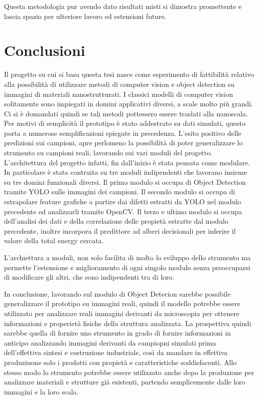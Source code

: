 \documentclass[12pt,a4paper,openright,twoside]{report}
\begin{document}
Questa metodologia pur avendo dato risultati misti si dimostra promettente e lascia spazio per ulteriore lavoro ed estensioni future. 


\begingroup
\let\clearpage\relax
\chapter*{Conclusioni}

Il progetto su cui si basa questa tesi nasce come esperimento di fattibilità relativo alla possibilità di utilizzare metodi di computer vision e object detection su immagini di materiali nanostrutturati. 
I classici modelli di computer vision solitamente sono impiegati in domini applicativi diversi, a scale molto più grandi. Ci si è domandati quindi se tali metodi pottessero essere traslati alla nanoscala. 
Per motivi di semplicità il prototipo è stato addestrato su dati simulati, questo porta a numerose semplificazioni spiegate in precedenza. 
L'esito positivo delle predizioni sui campioni, apre perlomeno la possibilità di poter generalizzare lo strumento su campioni reali, lavorando sui vari moduli del progetto.
L'architettura del progetto infatti, fin dall'inizio è stata pensata come modulare. In particolare è stata contruita su tre moduli indipendenti che lavorano insieme su tre domini funzionali diversi. Il primo modulo si occupa di Object Detection tramite YOLO sulle immagini dei campioni. Il secondo modulo si occupa di estrapolare feature grafiche a partire dai difetti estratti da YOLO nel modulo precedente ed analizzarli tramite OpenCV. Il terzo e ultimo modulo si occupa dell'analisi dei dati e della correlazione delle propietà estratte dal modulo precedente, inoltre incorpora il predittore ad alberi decisionali per inferire il valore della total energy cercata. 

L'archiettura a moduli, non solo facilita di molto lo sviluppo dello strumento ma permette l'estensione e miglioramento di ogni singolo modulo senza preoccuparsi di modificare gli altri, che sono indipendenti tra di loro.

In conclusione, lavorando sul modulo di Object Detecion sarebbe possibile generalizzare il prototipo su immagini reali, quindi il modello potrebbe essere utilizzato per analizzare reali immagini derivanti da microscopia per ottenere informazioni e properietà fisiche della struttura analizzata. 
La prospettiva quindi sarebbe quella di fornire uno strumento in grado di fornire informazioni in anticipo analizzando immagini derivanti da campiopni simulati prima dell'effettiva sintesi e costruzione industriale, così da mandare in effettiva produziuone solo i prodotti con propietà e caratteristiche soddisfacenti. 
Allo stesso modo lo strumento potrebbe essere utilizzato anche dopo la produzione per analizzare materiali e strutture già esistenti, partendo semplicemente dalle loro immagini e la loro scala.
\end{document}
